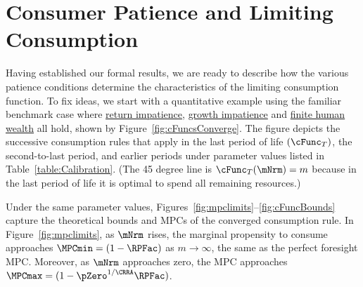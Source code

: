 \documentclass[\econtexRoot/BufferStockTheory]{subfiles}
\begin{document}
\hypertarget{Discussion-Growth-Impatience}{}
\section{Consumer Patience and Limiting Consumption}\label{sec:GICdiscussion}

\renewcommand{\figName}{cFuncsConverge} 
 

Having established our formal results, we are ready to describe how the various patience conditions determine the characteristics of the limiting consumption function.
To fix ideas, we start with a quantitative example using the familiar benchmark case where \hyperlink{RIC}{return impatience}, \hyperlink{GICRaw}{growth impatience} and \hyperlink{FHWC}{finite human wealth} all hold, shown by Figure~\ref{fig:cFuncsConverge}.
The figure depicts the successive consumption rules that apply in the last period of life $(\cFunc_{T})$, the second-to-last period, and earlier periods under parameter values listed in Table~\ref{table:Calibration}.
(The 45 degree line is $\cFunc_{T}(\mNrm) = m$ because in the last period of life it is optimal to spend all remaining resources.)

Under the same parameter values, Figures~\ref{fig:mpclimits}--\ref{fig:cFuncBounds} capture the theoretical bounds and MPCs of the converged consumption rule.
In Figure~\ref{fig:mpclimits}, as $\mNrm$ rises, the marginal propensity to consume approaches $\MPCmin=(1-\RPFac)$ as $m \rightarrow \infty$, the same as the perfect foresight MPC.
Moreover, as $\mNrm$ approaches zero, the MPC approaches $\MPCmax=(1-\pZero^{1/\CRRA}\RPFac)$.


\renewcommand{\figFile}{mpclimits}
\hypertarget{\figFile}{}

\renewcommand{\figFile}{cFuncBounds}
\hypertarget{\figFile}{}

\end{document}
